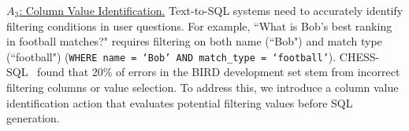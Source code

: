 \uline{$A_3$: Column Value Identification.}
Text-to-SQL systems need to accurately identify filtering conditions in user questions. For example, ``What is Bob's best ranking in football matches?" requires filtering on both name (``Bob") and match type (``football") (\eg \texttt{WHERE name = `Bob' AND match\_type = `football'}).
CHESS-SQL~\cite{chesssql} found that 20\% of errors in the BIRD development set stem from incorrect filtering columns or value selection. 
To address this, we introduce a column value identification action that evaluates potential filtering values before SQL generation.

